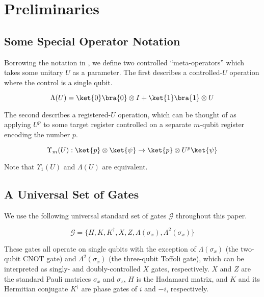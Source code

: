 \section{Preliminaries}
\label{sec:prelims}

\subsection{Some Special Operator Notation}

Borrowing the notation in \cite{ksv02},
we define two controlled ``meta-operators'' which takes some unitary $U$ as
a parameter. The first describes a controlled-$U$ operation where the control
is a single qubit.

\begin{displaymath}
\Lambda(U) = \ket{0}\bra{0} \otimes I + \ket{1}\bra{1} \otimes U
\end{displaymath}

The second describes a registered-$U$ operation, which
can be thought of as applying $U^p$ to some target register
controlled on a separate $m$-qubit register
encoding the number $p$.

\begin{displaymath}
\Upsilon_m(U) : \ket{p} \otimes \ket{\psi} \rightarrow \ket{p}
\otimes U^p\ket{\psi}
\end{displaymath}

Note that $\Upsilon_1(U)$ and $\Lambda(U)$ are equivalent.

\subsection{A Universal Set of Gates}

We use the following universal standard set of gates $\mathcal{G}$ throughout
this paper.

\begin{displaymath}
\mathcal{G} = \{ H, K, K^{\dagger}, X, Z,
\Lambda(\sigma_x), \Lambda^2(\sigma_x) \}
\end{displaymath}

These gates all operate on single qubits with the
exception of $\Lambda(\sigma_x)$ (the two-qubit CNOT gate)
and $\Lambda^2(\sigma_x)$ (the three-qubit Toffoli gate),
which can be interpreted as singly- and doubly-controlled
$X$ gates, respectively. $X$ and $Z$ are the standard Pauli matrices
$\sigma_x$ and $\sigma_z$, $H$ is the Hadamard matrix, and $K$ and its
Hermitian conjugate $K^{\dagger}$ are phase gates of $i$ and $-i$,
respectively.


